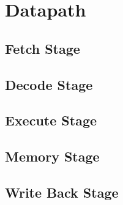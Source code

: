 %
\chapter{Datapath}
\label{cha2}
\section{Fetch Stage}
\section{Decode Stage}
\section{Execute Stage}
\section{Memory Stage}
\section{Write Back Stage}